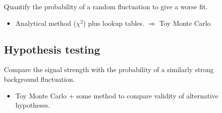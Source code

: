Quantify the probability of a random fluctuation to give a worse fit.

\begin{itemize}[$\to$]
	\item Analytical method (\eg $\chi^{2}$) plus lookup tables.
		$\Rightarrow$ Toy Monte Carlo
\end{itemize}

\subsection{Hypothesis testing}
\label{subsec:hypothesis_test}

Compare the signal strength with the probability of a similarly strong background fluctuation.

\begin{itemize}[$\Rightarrow$]
	\item Toy Monte Carlo + some method to compare validity of alternative hypotheses.
\end{itemize}
